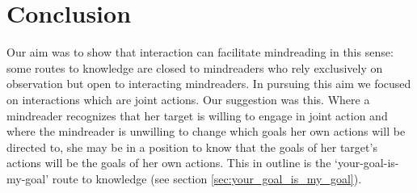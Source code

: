 \documentclass[12pt,a4paper]{extarticle}
\begin{document}




\section{Conclusion}
Our aim was to show that interaction can facilitate mindreading in this sense:
some routes to knowledge are closed to mindreaders who rely exclusively on observation
but
open to interacting mindreaders.
In pursuing this aim we focused on interactions which are joint actions.
Our suggestion was this.
Where a mindreader recognizes that her target is willing to engage in joint action
and where the mindreader is unwilling to change which goals her own actions will be directed to,
she may be in a position to know
that the goals of her target's actions will be the goals of her own actions.
This in outline is the `your-goal-is-my-goal' route to  knowledge (see  section \vref{sec:your_goal_is_my_goal}).


\end{document}
